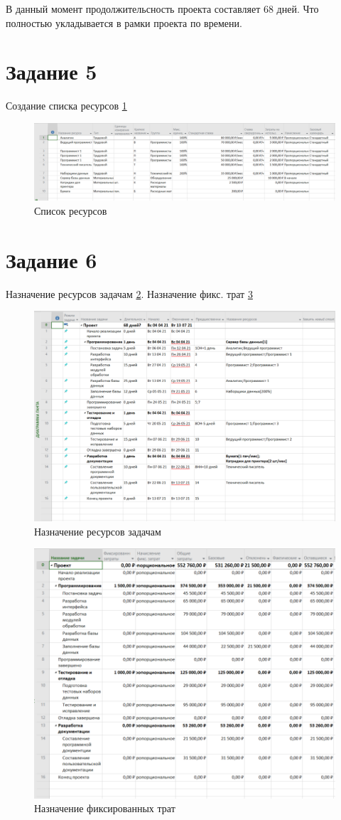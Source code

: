 В данный момент продолжительсность проекта составляет 68 дней. Что полностью укладывается в рамки проекта по времени.

\section{Задание 5}
Создание списка ресурсов \ref{fig:8}
\begin{figure}[H]
	\centering
	\includegraphics[width=0.7\linewidth]{src/8}
	\caption{Список ресурсов}
	\label{fig:8}
\end{figure}

\section{Задание 6}
Назначение ресурсов задачам \ref{fig:9}.
Назначение фикс. трат \ref{fig:10}
\begin{figure}[H]
	\centering
	\includegraphics[width=0.7\linewidth]{src/9}
	\caption{Назначение ресурсов задачам}
	\label{fig:9}
\end{figure}
\begin{figure}[H]
	\centering
	\includegraphics[width=0.7\linewidth]{src/10}
	\caption{Назначение фиксированных трат}
	\label{fig:10}
\end{figure}

